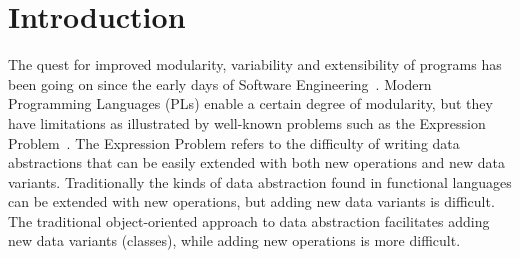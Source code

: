 \section{Introduction}\label{sec:introduction}
 
The quest for improved modularity, variability and extensibility of
programs has been going on since the early days of Software
Engineering~\cite{McIlroy68}. Modern Programming Languages (PLs) enable a certain
degree of modularity, but they have limitations as illustrated by
well-known problems such as the Expression Problem~\cite{wadler1998expression}. The
Expression Problem refers to the difficulty of writing data
abstractions that can be easily extended with both new operations and
new data variants. Traditionally the kinds of data abstraction found
in functional languages can be extended with new operations, but
adding new data variants is difficult. The traditional object-oriented
approach to data abstraction facilitates adding new data variants
(classes), while adding new operations is more difficult.

\begin{comment}
A reason why a solution to the Expression Problem is important in
practice is that it is necessary for the development of
\emph{Software-Product Lines} (SPLs)~\cite{}. A software-product line
is a reusable set of components, which can be combined in multiple ways
to obtain different programs. Programming languages offer a concrete
example for SPLs. A SPL for programming languages would allow us to
model various typical operations of programming languages (such as
evaluation, compilation, or parsing) for various different language
constructs (such as binding, arithmetic, conditional or loops)
independently and separately. For example, evaluation components could be defined
independently for binding and arithmetic constructs. If the language
to be implemented is the pure lambda calculus, only evaluation of
binding constructs is necessary. However, more realistic programming
languages will include arithmetic constructs, and will require 
evaluation for such constructs as well. In this case 
both the component for evaluation of binders and arithmetic 
expressions can be combined to implement the desired functionality.
\end{comment}

